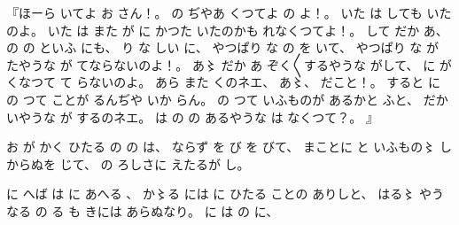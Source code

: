 %
『ほーら
いてよ
お
さん！。
%
の
ぢやあ
くつてよ
の
よ！。
%
いた
は
しても
いたのよ。
%
いた
は
また
が
に
かつた
いたのかも
れなくつてよ！。
%
して
だか
あ、
%
の
の
といふ
にも、
%
り
な
しい
に、
%
やつぱり
な
の
を
いて、
%
やつぱり
な
が%
たやうな
が
てならないのよ！。
%
あ〻%
だか
あ
ぞく〳〵するやうな
がして、%
%
に
が
くなつて
て
らないのよ。
%
あら
また
くのネエ、
%
あ〻、%
%
だこと！。
%
すると
に
の
つて
ことが
るんぢや
いか
らん。
%
の
つて
いふものが
あるかと
ふと、
%
だか
いやうな
が
するのネエ。
%
は
の
の
あるやうな
は%
なくつて？。
』

%
お
が
かく
ひたる
の
の
は、
%
ならず
を
び
を
びて、
%
まことに
と
いふもの〻%
しからぬを
じて、
%
の
ろしさに
えたるが
し。

%
に
へば
は
に
あへる
、
%
か〻る%
には
に
ひたる
ことの
ありしと、
%
はる〻%
やうなる
の%
る
も
きには
あらぬなり。
%
に
は
の
に、

